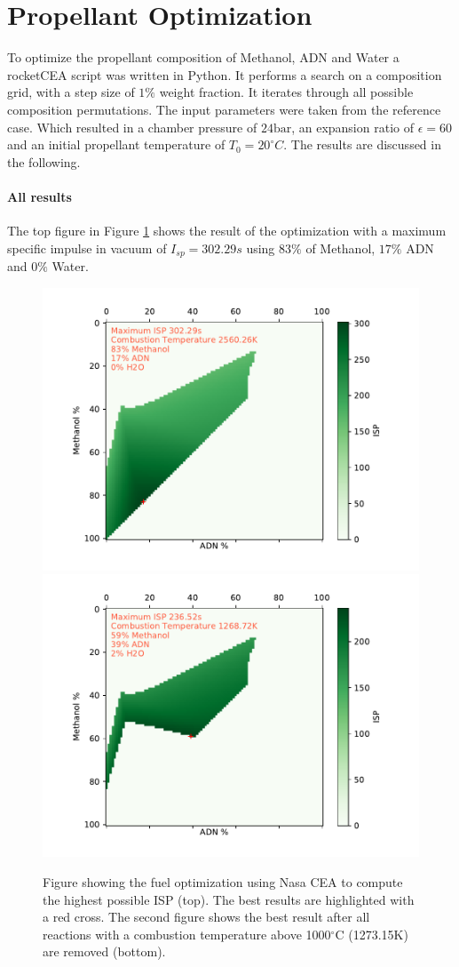 \documentclass[12pt]{article}
\begin{document}
\section{Propellant Optimization}
To optimize the propellant composition of Methanol, ADN and Water a rocketCEA script was written in Python. It performs a search on a composition grid, with a step size of $1\%$ weight fraction. It iterates through all possible composition permutations. The input parameters were taken from the reference case. Which resulted in a chamber pressure of $24\text{bar}$, an expansion ratio of  $\epsilon=60$ and an initial propellant temperature of $T_0=20^{\circ}C$. The results are discussed in the following.

\paragraph{All results}
The top figure in Figure \ref{fig:fuel_optimization_all_results} shows the result of the optimization with a maximum specific impulse in vacuum of $I_{sp}=302.29s$ using $83\%$ of Methanol, $17\%$ ADN and $0\%$ Water.

\begin{figure}[!h]
	\centering
	\includegraphics[width=0.8\linewidth]{figures/b2_1.pdf}
	\includegraphics[width=0.8\linewidth]{figures/b2_2.pdf}
	\caption{Figure showing the fuel optimization using Nasa CEA to compute the highest possible ISP (top). The best results are highlighted with a red cross. The second figure shows the best result after all reactions with a combustion temperature above 1000$^\circ$C (1273.15K) are removed (bottom).}
	\label{fig:fuel_optimization_all_results}
\end{figure}
\end{document}
